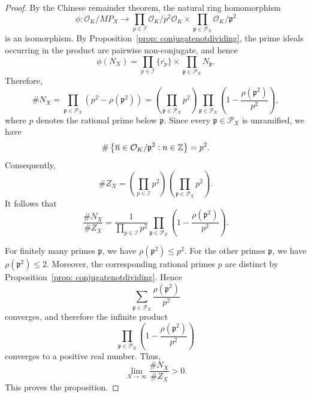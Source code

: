 \documentclass[11pt]{amsart}
\numberwithin{equation}{section}
\theoremstyle{definition}
\begin{document}
\begin{proof}
    By the Chinese remainder theorem, the natural ring homomorphism
    \[
        \phi: \mathcal{O}_K/MP_X \longrightarrow \prod_{p\in\mathcal{I}} \mathcal{O}_K/p^2\mathcal{O}_K \times \prod_{\mathfrak{p}\in\mathcal{P}_X} \mathcal{O}_K/\mathfrak{p}^2
    \]
    is an isomorphism. By Proposition~\ref{prop: conjugatenotdividing}, the prime ideals occurring in the product are pairwise non-conjugate, and hence
    \[
        \phi(N_X) = \prod_{p\in\mathcal{I}}\{\overline{r_p}\} \times \prod_{\mathfrak{p}\in\mathcal{P}_X} N_{\mathfrak{p}}.
    \]
    Therefore,
    \[
        \#N_X = \prod_{\mathfrak{p}\in\mathcal{P}_X} \left(p^2-\rho(\mathfrak{p}^2)\right) = \left(\prod_{\mathfrak{p}\in\mathcal{P}_X}p^2\right) \prod_{\mathfrak{p}\in\mathcal{P}_X} \left(1-\frac{\rho(\mathfrak{p}^2)}{p^2}\right),
    \]
    where $p$ denotes the rational prime below $\mathfrak{p}$. Since every $\mathfrak{p}\in\mathcal{P}_X$ is unramified, we have
    \[ 
        \#\left\{\overline{n}\in\mathcal{O}_K/\mathfrak{p}^2 \vcentcolon n\in\mathbb{Z}\right\} = p^2.
    \]
    Consequently,
    \[  
        \#Z_X =\left(\prod_{p\in\mathcal{I}}p^2\right)\left(\prod_{\mathfrak{p}\in\mathcal{P}_X}p^2\right).
    \]
    It follows that
    \[
        \frac{\#N_X}{\#Z_X} = \frac{1}{\displaystyle\prod_{p\in\mathcal{I}}p^2} \prod_{\mathfrak{p}\in\mathcal{P}_X} \left(1-\frac{\rho(\mathfrak{p}^2)}{p^2}\right).
    \]
    
    For finitely many primes $\mathfrak{p}$, we have $\rho(\mathfrak{p}^2)\leq p^2$. For the other primes $\mathfrak{p}$, we have $\rho(\mathfrak{p}^2)\leq2$. Moreover, the corresponding rational primes $p$ are distinct by Proposition~\ref{prop: conjugatenotdividing}. Hence
    \[
        \sum_{\mathfrak{p} \in \mathcal{P}_X} \frac{\rho(\mathfrak{p}^2)}{p^2}
    \]
    converges, and therefore the infinite product
    \[
        \prod_{\mathfrak{p} \in \mathcal{P}_X}\left(1-\frac{\rho(\mathfrak{p}^2)}{p^2}\right)
    \]
    converges to a positive real number. Thus,
    \[
        \lim_{X\to\infty}\frac{\#N_X}{\#Z_X}>0.
    \]
    This proves the proposition.
\end{proof}
\end{document}
